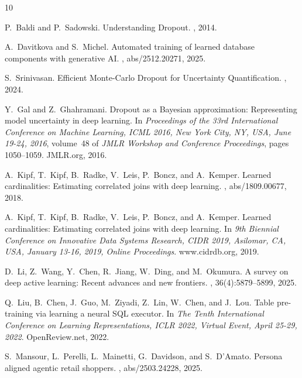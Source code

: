 \documentclass[a4paper]{report}
\begin{document}
\renewcommand{\bibname}{References}
\begin{thebibliography}{10}

P.~Baldi and P.~Sadowski.
\newblock Understanding Dropout.
, 2014.

A.~Davitkova and S.~Michel.
\newblock Automated training of learned database components with generative
  {AI}.
, abs/2512.20271, 2025.

S.~Srinivasan.
\newblock Efficient Monte-Carlo Dropout for Uncertainty Quantification.
, 2024.

Y.~Gal and Z.~Ghahramani.
\newblock Dropout as a Bayesian approximation: Representing model uncertainty
  in deep learning.
\newblock In {\em Proceedings of the 33rd International Conference on Machine
  Learning, {ICML} 2016, New York City, NY, USA, June 19-24, 2016}, volume~48
  of {\em {JMLR} Workshop and Conference Proceedings}, pages 1050--1059.
  JMLR.org, 2016.

A.~Kipf, T.~Kipf, B.~Radke, V.~Leis, P.~Boncz, and A.~Kemper.
\newblock Learned cardinalities: Estimating correlated joins with deep
  learning.
, abs/1809.00677, 2018.

A.~Kipf, T.~Kipf, B.~Radke, V.~Leis, P.~Boncz, and A.~Kemper.
\newblock Learned cardinalities: Estimating correlated joins with deep
  learning.
\newblock In {\em 9th Biennial Conference on Innovative Data Systems Research,
  {CIDR} 2019, Asilomar, CA, USA, January 13-16, 2019, Online Proceedings}.
  www.cidrdb.org, 2019.

D.~Li, Z.~Wang, Y.~Chen, R.~Jiang, W.~Ding, and M.~Okumura.
\newblock A survey on deep active learning: Recent advances and new frontiers.
, 36(4):5879--5899,
  2025.

Q.~Liu, B.~Chen, J.~Guo, M.~Ziyadi, Z.~Lin, W.~Chen, and J.~Lou.
 Table pre-training via learning a neural {SQL} executor.
\newblock In {\em The Tenth International Conference on Learning
  Representations, {ICLR} 2022, Virtual Event, April 25-29, 2022}.
  OpenReview.net, 2022.

S.~Mansour, L.~Perelli, L.~Mainetti, G.~Davidson, and S.~D'Amato.
 Persona aligned agentic retail shoppers.
, abs/2503.24228, 2025.


\end{thebibliography}
\end{document}
